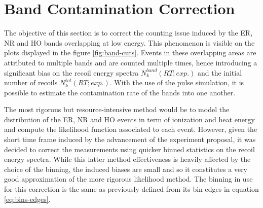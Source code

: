 

\section{Band Contamination Correction}
\label{par:contamination-correction}

The objective of this section is to correct the counting issue induced by the ER, NR and HO bands overlapping at low energy. This phenomenon is visible on the plots displayed in the figure \ref{fig:band-cuts}. Events in these overlapping areas are attributed to multiple bands and are counted multiple times, hence introducing a significant bias on the recoil energy spectra $N_k^{band} (RT; exp.)$ and the initial number of recoils $N_k^{tot} (RT; exp.)$. With the use of the pulse simulation, it is possible to estimate the contamination rate of the bands into one another.

The most rigorous but resource-intensive method would be to model the distribution of the ER, NR and HO events in term of ionization and heat energy and compute the likelihood function associated to each event. However, given the short time frame induced by the advancement of the \Ricochet{} experiment proposal, it was decided to correct the measurements using quicker binned statistics on the recoil energy spectra. While this latter method effectiveness is heavily affected by the choice of the binning, the induced biases are small and so it constitutes a very good approximation of the more rigorous likelihood method.
 The binning in use for this correction is the same as previously defined from its bin edges in equation \ref{eq:bins-edges}.

